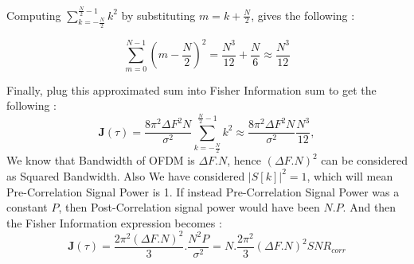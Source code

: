 \documentclass{article}
\begin{document}
Computing $\sum^{\frac{N}{2} - 1}_{k=-\frac{N}{2}}k^2$ by substituting $m=k+\frac{N}{2}$, gives the following :

$$\sum^{N-1}_{m=0}(m-\frac{N}{2})^2 = \frac{N^3}{12} + \frac{N}{6} \approx \frac{N^3}{12}$$

Finally, plug this approximated sum into Fisher Information sum to get the following :
$$\mathbf{J}(\tau) = \frac{8\pi^2 \Delta F^2 N}{\sigma^2}\sum^{\frac{N}{2} - 1}_{k=-\frac{N}{2}}k^2 \approx \frac{8\pi^2 \Delta F^2 N}{\sigma^2} \frac{N^3}{12},$$
We know that Bandwidth of OFDM is $\Delta F.N$, hence $(\Delta F . N)^2$ can be considered as Squared Bandwidth. Also We have considered $|S[k]|^2 = 1$, which will mean Pre-Correlation Signal Power is 1. If instead Pre-Correlation Signal Power was a constant $P$, then Post-Correlation signal power would have been $N.P$. And then the Fisher Information expression becomes :
$$\mathbf{J}(\tau) = \frac{2\pi^2 (\Delta F.N)^2}{3}. \frac{N^2 P}{\sigma^2} = N. \frac{2\pi^2}{3} (\Delta F.N)^2 SNR_{corr}$$
\end{document}
